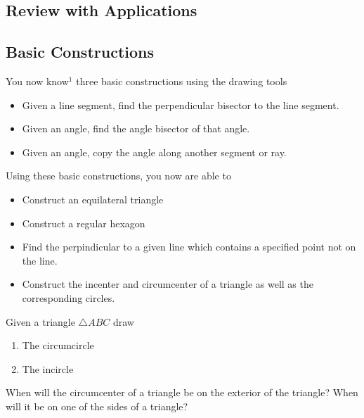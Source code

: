 \documentclass{tufte-handout}
\begin{document}
\begin{tcolorbox}[enhanced jigsaw,breakable,pad at break*=1mm,
  colback=cyan!2!white,colframe=blue!75!black,title=Student View: Slide 2,drop fuzzy shadow,watermark color=white,watermark text=\arabic{tcbbreakpart}]
 \section{Review with Applications}\subsection{Basic Constructions}
 You now know$^1$ three basic constructions using the drawing tools
 \begin{itemize}
     \item Given a line segment, find the perpendicular bisector to the line segment.
     \item Given an angle, find the angle bisector of that angle.
     \item Given an angle, copy the angle along another segment or ray.
 \end{itemize}
 
 Using these basic constructions, you now are able to 
 \begin{itemize}
     \item Construct an equilateral triangle
     \item Construct a regular hexagon
     \item Find the perpindicular to a given line which contains a specified point not on the line.
     \item Construct the incenter and circumcenter of a triangle as well as the corresponding circles.
 \end{itemize}

 Given a triangle $\triangle ABC$ draw
\begin{enumerate}
    \item The circumcircle
    \item The incircle
\end{enumerate}
 When will the circumcenter of a triangle be on the exterior of the triangle? When will it be on one of the sides of a triangle? 
\end{tcolorbox}


\pagebreak
{}
\end{document}
